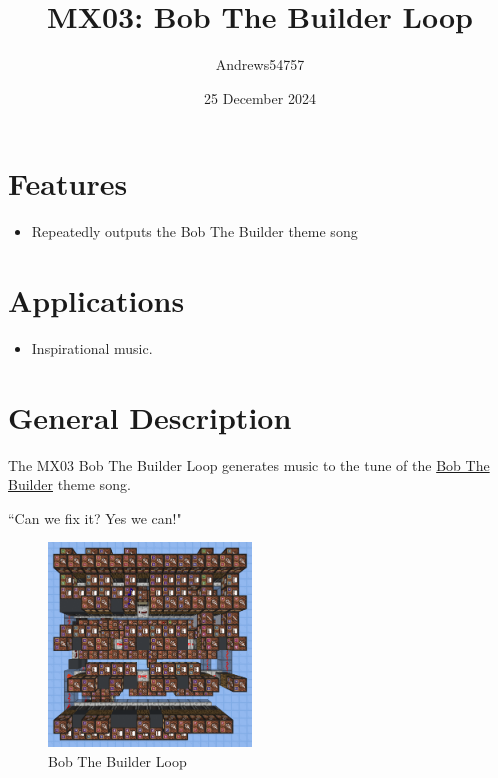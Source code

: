 \documentclass[10pt]{datasheet}
\title{MX03: Bob The Builder Loop}
\author{Andrews54757}
\date{25 December 2024}
\begin{document}
\maketitle

\section{Features}

\begin{itemize}
    \item{Repeatedly outputs the Bob The Builder theme song}
\end{itemize}

\section{Applications}

\begin{itemize}
    \item{Inspirational music.}
\end{itemize}

\section{General Description}
The MX03 Bob The Builder Loop generates music to the tune of the \href{https://www.youtube.com/watch?v=HdVg-2jn2OU}{Bob The Builder} theme song.

``Can we fix it? Yes we can!"
\vfill\break

\begin{figure}[H]
    \centering
    \includegraphics[width=0.48\textwidth]{bob.png}
    \caption{\centering Bob The Builder Loop}
\end{figure}

\onecolumn
\end{document}
